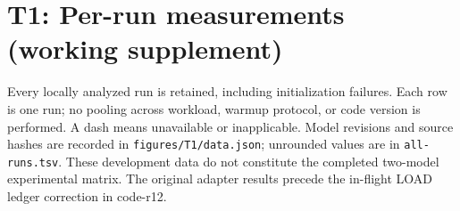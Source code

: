 \documentclass[10pt]{article}
\begin{document}
\section*{T1: Per-run measurements (working supplement)}
Every locally analyzed run is retained, including initialization failures.
Each row is one run; no pooling across workload, warmup protocol, or code version
is performed. A dash means unavailable or inapplicable. Model revisions and
source hashes are recorded in \texttt{figures/T1/data.json}; unrounded values are
in \texttt{all-runs.tsv}. These development data do not constitute the completed
two-model experimental matrix. The original adapter results precede the
in-flight LOAD ledger correction in code-r12.
{}
{}
\end{document}

